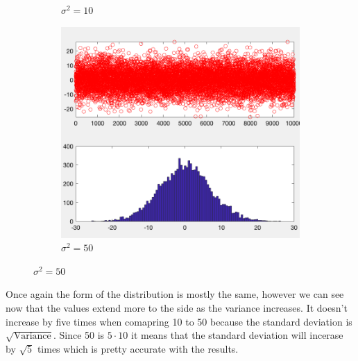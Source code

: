 \documentclass{article}
\begin{document}
\begin{figure}[H]
\begin{subfigure}[h]{0.33\linewidth}
        \caption{\( \sigma^2 = 10\)}
    \end{subfigure}
    \begin{subfigure}[h]{0.33\linewidth}
        \includegraphics[width=\linewidth]{imgs/q1c_50.png}
        \caption{\( \sigma^2 = 50\)}
    \end{subfigure}
\end{figure}
Once again the form of the distribution is mostly the same, however we can see now that the values
extend more to the side as the variance increases. It doesn't increase by five times when comapring 10 to 50 because
the standard deviation is \( \sqrt{\mathrm{Variance}} \). Since 50 is \( 5\cdot10 \) it means that the standard 
deviation will incerase by \(\sqrt{5} \) times which is pretty accurate with the results.   
\end{document}
